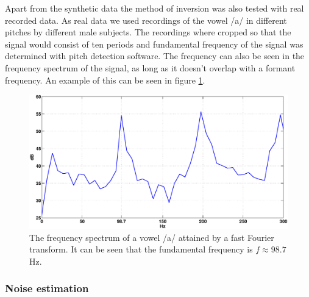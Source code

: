 \documentclass[12pt,a4]{article}
\begin{document}
Apart from the synthetic data the method of inversion was also tested with real recorded data. As real data we used recordings of the vowel /a/ in different pitches by different male subjects. The recordings where cropped so that the signal would consist of ten periods and fundamental frequency of the signal was determined with pitch detection software. The frequency can also be seen in the frequency spectrum of the signal, as long as it doesn't overlap with a formant frequency. An example of this can be seen in figure \ref{fig:lasse}.
\begin{figure}[H]
\begin{center}
	\includegraphics[width=.65\textwidth]{img/lasse_spectrum_cropped.eps}
	\caption{The frequency spectrum of a vowel /a/ attained by a fast Fourier transform. It can be seen that the fundamental frequency is $f \approx 98.7$ Hz.}\label{fig:lasse}
\end{center}
\end{figure}

\subsubsection{Noise estimation}
\label{sec:noiseEst}
\end{document}
